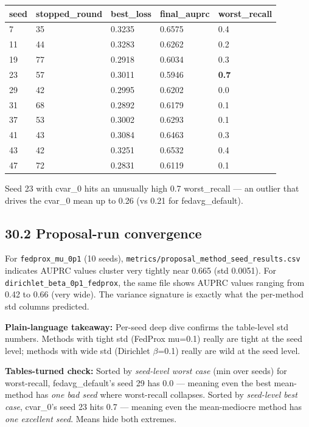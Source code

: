 \documentclass{article}
\begin{document}
\begin{table}[H]
  \centering
  \begin{tabular}{lllll}
    \toprule
    seed & stopped\_round & best\_loss & final\_auprc & worst\_recall \\
    \midrule
    7 & 35 & 0.3235 & 0.6575 & 0.4 \\
    11 & 44 & 0.3283 & 0.6262 & 0.2 \\
    19 & 77 & 0.2918 & 0.6034 & 0.3 \\
    23 & 57 & 0.3011 & 0.5946 & \textbf{0.7} \\
    29 & 42 & 0.2995 & 0.6202 & 0.0 \\
    31 & 68 & 0.2892 & 0.6179 & 0.1 \\
    37 & 53 & 0.3002 & 0.6293 & 0.1 \\
    41 & 43 & 0.3084 & 0.6463 & 0.3 \\
    43 & 42 & 0.3251 & 0.6532 & 0.4 \\
    47 & 72 & 0.2831 & 0.6119 & 0.1 \\
    \bottomrule
  \end{tabular}
\end{table}


Seed 23 with cvar\_0 hits an unusually high 0.7 worst\_recall --- an outlier that drives the cvar\_0 mean up to 0.26 (vs 0.21 for fedavg\_default).


\subsection{30.2 Proposal-run convergence}


For \texttt{fedprox\_mu\_0p1} (10 seeds), \texttt{metrics/proposal\_method\_seed\_results.csv} indicates AUPRC values cluster very tightly near 0.665 (std 0.0051). For \texttt{dirichlet\_beta\_0p1\_fedprox}, the same file shows AUPRC values ranging from 0.42 to 0.66 (very wide). The variance signature is exactly what the per-method std columns predicted.


\textbf{Plain-language takeaway:} Per-seed deep dive confirms the table-level std numbers. Methods with tight std (FedProx mu=0.1) really are tight at the seed level; methods with wide std (Dirichlet \ensuremath{\beta}=0.1) really are wild at the seed level.


\textbf{Tables-turned check:} Sorted by \emph{seed-level worst case} (min over seeds) for worst-recall, fedavg\_default's seed 29 has 0.0 --- meaning even the best mean-method has \emph{one bad seed} where worst-recall collapses. Sorted by \emph{seed-level best case}, cvar\_0's seed 23 hits 0.7 --- meaning even the mean-mediocre method has \emph{one excellent seed}. Means hide both extremes.
\end{document}
